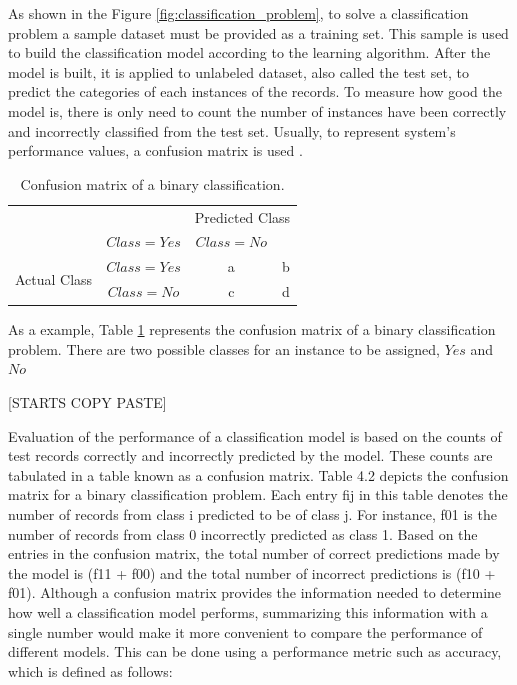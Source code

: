 As shown in the Figure \ref{fig:classification_problem}, to solve a classification problem a sample dataset must be provided as a training set. This sample is used to build the classification model according to the learning algorithm. After the model is built, it is applied to unlabeled dataset, also called the test set, to predict the categories of each instances of the records. To measure how good the model is, there is only need to count the number of instances have been correctly and incorrectly classified from the test set. Usually, to represent system's performance values, a confusion matrix is used \cite{hamilton2000confusion}. 


\begin{table}[!htp]
\centering
\begin{tabular}{ |c|c|c|c| }
\hline
\multicolumn{2}{|c|}{} & \multicolumn{2}{c|}{Predicted Class} \\
\hhline{~~--}
\multicolumn{2}{|c|}{} & $Class = Yes$ & $Class = No$ \\ \hline
\multirow{2}{*}{Actual Class} & $Class = Yes$ & a & b \\
\hhline{~---}
& $Class = No$ & c & d \\
\hline
\end{tabular}
\label{tab:confusion_matrix}
\caption{Confusion matrix of a binary classification.}
\end{table}

As a example, Table \ref{tab:confusion_matrix} represents the confusion matrix of a binary classification problem. 
\iffalse
There are two possible classes for an instance to be assigned, $Yes$ and $No$

[STARTS COPY PASTE]

Evaluation of the performance of a classification model is based on the counts of test records correctly and incorrectly predicted by the model. These counts are tabulated in a table known as a confusion matrix. Table 4.2 depicts the confusion matrix for a binary classification problem. Each entry fij in this table denotes the number of records from class i predicted to be of class j. For instance, f01 is the number of records from class 0 incorrectly predicted as class 1. Based on the entries in the confusion matrix, the total number of correct predictions made by the model is (f11 + f00) and the total number of incorrect predictions is (f10 + f01).
Although a confusion matrix provides the information needed to determine how well a classification model performs, summarizing this information with a single number would make it more convenient to compare the performance of different models. This can be done using a performance metric such as accuracy, which is defined as follows:


